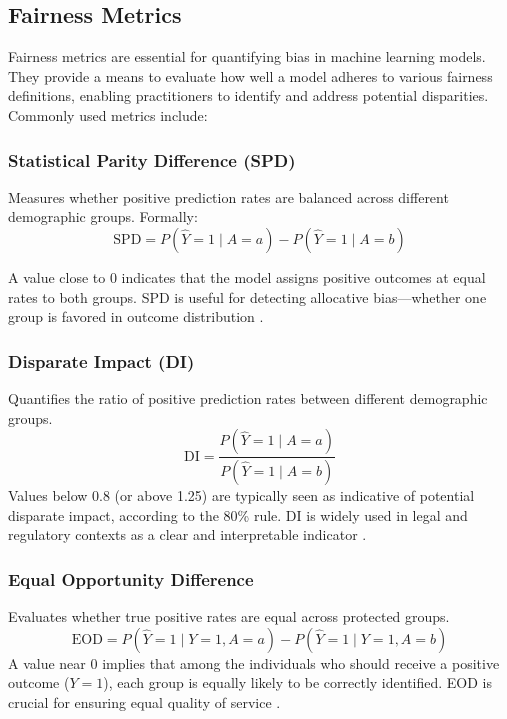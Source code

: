 \documentclass[12pt,a4paper,openright,twoside]{book}
\begin{document}
\subsection{Fairness Metrics}
Fairness metrics are essential for quantifying bias in machine learning models. They provide a means to evaluate how well a model adheres to various fairness definitions, enabling practitioners to identify and address potential disparities. Commonly used metrics include:

\subsubsection{Statistical Parity Difference (SPD)} 
Measures whether positive prediction rates are balanced across different demographic groups. Formally:
\begin{equation}
    \text{SPD} = P(\hat{Y}=1 \mid A=a) - P(\hat{Y}=1 \mid A=b)
\end{equation}

A value close to 0 indicates that the model assigns positive outcomes at equal rates to both groups. SPD is useful for detecting allocative bias—whether one group is favored in outcome distribution \cite{dwork2011fairnessawareness}.

\subsubsection{Disparate Impact (DI)} 
Quantifies the ratio of positive prediction rates between different demographic groups.
\begin{equation}
    \text{DI} = \frac{P(\hat{Y}=1 \mid A=a)}{P(\hat{Y}=1 \mid A=b)}
\end{equation}
Values below 0.8 (or above 1.25) are typically seen as indicative of potential disparate impact, according to the 80\% rule. DI is widely used in legal and regulatory contexts as a clear and interpretable indicator \cite{feldman2015certifyingremovingdisparateimpact}.

\subsubsection{Equal Opportunity Difference} 
Evaluates whether true positive rates are equal across protected groups.
\begin{equation}
    \text{EOD} = P(\hat{Y}=1 \mid Y=1, A=a) - P(\hat{Y}=1 \mid Y=1, A=b)
\end{equation}
A value near 0 implies that among the individuals who should receive a positive outcome (\begin{math}
{Y=1} \end{math}), each group is equally likely to be correctly identified. EOD is crucial for ensuring equal quality of service \cite{hardt2016equalityopportunitysupervisedlearning}.
\end{document}
